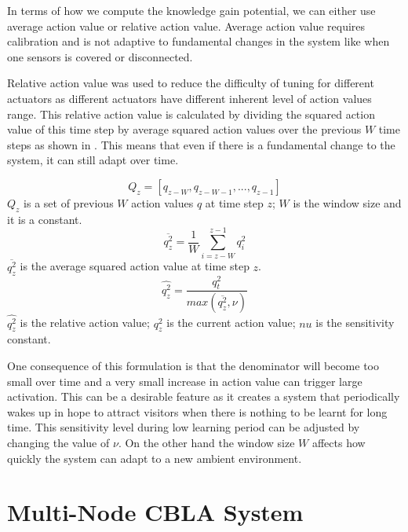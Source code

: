 In terms of how we compute the knowledge gain potential, we can either use average action value or relative action value. Average action value requires calibration and is not adaptive to fundamental changes in the system like when one sensors is covered or disconnected. 

Relative action value was used to reduce the difficulty of tuning for different actuators as different actuators have different inherent level of action values range. This relative action value is calculated by dividing the squared action value of this time step by average squared action values over the previous $W$ time steps as shown in . This means that even if there is a fundamental change to the system, it can still adapt over time.  

\begin{equation}\label{eqn:action_val_set}
	Q_z = [q_{z-W}, q_{z-W-1}, ... , q_{z-1}]
\end{equation}
$Q_z$ is a set of previous $W$ action values $q$ at time step $z$; $W$ is the window size and it is a constant.
\begin{equation}\label{eqn:avg_action_val}
	\overline{q^2_z} = \frac{1}{W}\displaystyle\sum_{i=z-W}^{z-1} q_i^2
\end{equation}
$\overline{q^2_z}$ is the average squared action value at time step $z$.
\begin{equation}\label{eqn:relative_action_val}
	\widehat{q^2_z} = \frac{q_t^2}{max(\overline{q^2_z}, \nu)}
\end{equation}
$\widehat{q^2_z}$ is the relative action value; $q_z^2$ is the current action value; $nu$ is the sensitivity constant.

One consequence of this formulation is that the denominator will become too small over time and a very small increase in action value can trigger large activation. This can be a desirable feature as it creates a system that periodically wakes up in hope to attract visitors when there is nothing to be learnt for long time. This sensitivity level during low learning period can be adjusted by changing the value of $\nu$. On the other hand the window size $W$ affects how quickly the system can adapt to a new ambient environment. 


\section{Multi-Node CBLA System}

